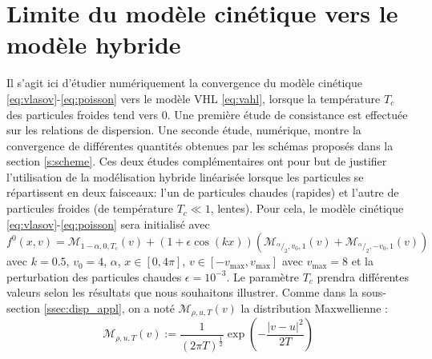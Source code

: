 
\section{Limite du modèle cinétique vers le modèle hybride}
 \label{s:limit}

Il s'agit ici d'\'etudier num\'eriquement la convergence du modèle cinétique \eqref{eq:vlasov}-\eqref{eq:poisson} vers le modèle VHL \eqref{eq:vahl}, lorsque la température $T_c$ des particules froides tend vers 0. Une première étude de consistance est effectuée sur les relations de dispersion. Une seconde étude, numérique, montre la convergence de différentes quantités obtenues par les schémas proposés dans la section \ref{s:scheme}. Ces deux études complémentaires ont pour but de justifier l'utilisation de la modélisation hybride linéarisée lorsque les particules se répartissent en deux faisceaux: l'un de particules chaudes (rapides) et l'autre de particules froides (de température $T_c\ll 1$, lentes). Pour cela, le mod\`ele cin\'etique \eqref{eq:vlasov}-\eqref{eq:poisson} sera initialis\'e avec 
\begin{equation}
  f^0(x,v) = \mathcal{M}_{1-\alpha,0,T_c}(v) + (1+\epsilon\cos(kx))\left( \mathcal{M}_{^\alpha/_2,v_0,1}(v) + \mathcal{M}_{^\alpha/_2,-v_0,1}(v) \right)
\label{eq:K:init}
\end{equation}
avec $k = 0.5$, $v_0 = 4$, $\alpha$, $x\in[0,4\pi]$, $v\in[-v_{\text{max}},v_{\text{max}}]$ avec $v_{\text{max}}=8$ et la perturbation des particules chaudes $\epsilon = 10^{-3}$.  Le param\`etre $T_c$ prendra différentes valeurs selon les résultats que nous souhaitons illustrer. Comme dans la sous-section \ref{ssec:disp_appl}, on a not\'e  $\mathcal{M}_{\rho,u,T}(v)$ la distribution Maxwellienne :
$$
  \mathcal{M}_{\rho,u,T}(v) := \frac{1}{(2\pi T)^{\frac{1}{2}}}\exp\left(-\frac{\left|v-u\right|^2}{2T}\right)
$$

